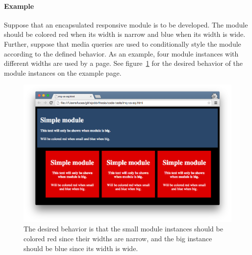 \documentclass[a4paper,11pt]{kth-mag}
\begin{document}
        \paragraph{Example}
        Suppose that an \gls{encapsulated} \gls{responsive} module is to be developed.
        The module should be colored red when its width is narrow and blue when its width is wide.
        Further, suppose that \gls{media queries} are used to conditionally style the module according to the defined behavior.
        As an example, four module instances with different widths are used by a page.
        See figure~\ref{fig:problem-eq} for the desired behavior of the module instances on the example page.
        \begin{figure}[ht]
          \centering
          \begin{minipage}{.5\textwidth}
            \centering
            \includegraphics[width=\linewidth]{images/eq-big}
          \end{minipage}%
          \caption{
            The desired behavior is that the small module instances should be colored red since their widths are narrow, and the big instance should be blue since its width is wide.
          }
          \label{fig:problem-eq}
        \end{figure}
\end{document}
